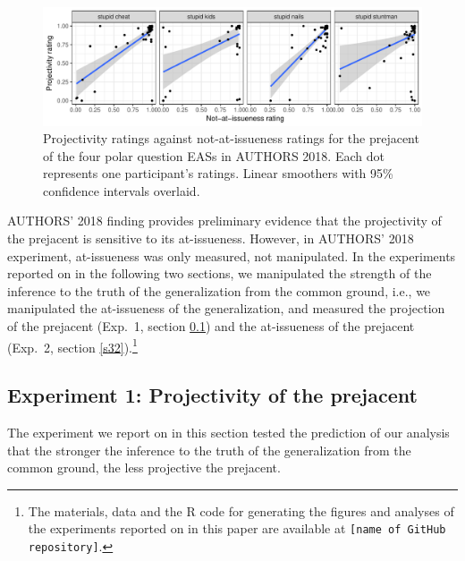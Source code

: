 \documentclass[11pt,fleqn]{article}
\newcommand{\6}{\mbox{$[\hspace*{-.6mm}[$}}
\newcommand{\9}{\mbox{$]\hspace*{-.6mm}]$}}
\begin{document}
\begin{figure}[h!]
\centering

\includegraphics[width=1\textwidth]{figures/Exp1a-subject-projai-stupid}

\caption{Projectivity ratings against not-at-issueness ratings for the prejacent of the four polar question EASs in AUTHORS 2018. Each dot represents one participant's ratings. Linear smoothers with 95\% confidence intervals overlaid.}
\label{f-corr}
\end{figure}
AUTHORS' 2018 finding provides preliminary evidence that the projectivity of the prejacent is sensitive to its at-issueness. However, in AUTHORS' 2018 experiment, at-issueness was only measured, not manipulated. In the experiments reported on in the following two sections, we manipulated the strength of the inference to the truth of the generalization from the common ground, i.e., we manipulated the at-issueness of the generalization, and measured the projection of the prejacent (Exp.~1, section \ref{s31}) and the at-issueness of the prejacent (Exp.~2, section \ref{s32}).\footnote{\label{f-git}The
materials, data and the R code for generating the figures and analyses of the experiments reported on in this paper are available at {\tt [name of GitHub repository]}.}

\subsection{Experiment 1: Projectivity of the prejacent}\label{s31}

The experiment we report on in this section tested the prediction of our analysis that the stronger the inference to the truth of the generalization from the common ground, the less projective the prejacent.
\end{document}
